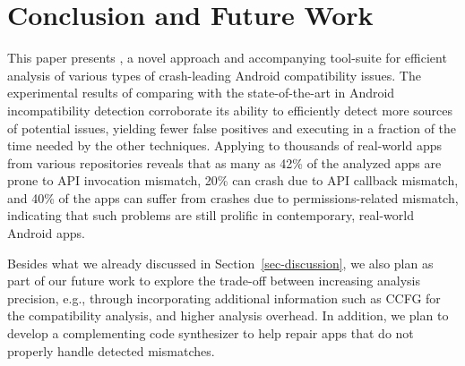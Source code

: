 \section{Conclusion and Future Work}\label{sec-conclusion}

This paper presents \@approach, a novel approach and
accompanying tool-suite for efficient analysis of various
types of crash-leading Android compatibility issues.  The
experimental results of comparing \@approach with the
state-of-the-art in Android incompatibility detection
corroborate its ability to efficiently detect more sources
of potential issues, yielding fewer false positives and
executing in a fraction of the time needed by the other
techniques.  Applying \@approach to thousands of real-world
apps from various repositories reveals that as many as 42\%
of the analyzed apps are prone to API invocation mismatch,
20\% can crash due to API callback mismatch, and 40\% of the
apps can suffer from crashes due to permissions-related
mismatch, indicating that such problems are still prolific
in contemporary, real-world Android apps. 

Besides what we already discussed in Section~\ref{sec-discussion}, we also plan as part of our future work to explore the trade-off between increasing analysis precision, e.g.,
through incorporating additional information such as CCFG for the compatibility analysis, and higher analysis overhead. In addition, we plan to develop a complementing code synthesizer to help repair apps that do not properly handle detected mismatches. 

\begin{comment}
\commentcs{
We also plan to develop new detectors to identify other events that can lead to dependability and security issues. 
Another idea
is to provide guidance to users to replace the use of
possibly outdated or deprecated APIs with more updated
ones.  For example, our system can recommend a
developer to replace the old SSL API with the new one.
While the old one still works,  it is less secure than
the newer API.
}
\end{comment}
 

 

